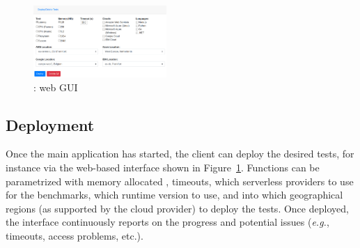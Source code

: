 \begin{figure}[!t]
\begin{center}
\includegraphics[width=0.45\textwidth]{bilder/ui.png}
\caption{\sys: web GUI}
\label{fig:ui}
\end{center}
\end{figure}

\subsection{Deployment}
Once the main application has started, the client can deploy the desired tests, for instance via the web-based interface shown in Figure~\ref{fig:ui}.
Functions can be parametrized with memory allocated , timeouts, which serverless providers to use for the benchmarks, which runtime version to use, and into which geographical regions (as supported by the cloud provider) to deploy the tests. 
Once deployed, the interface continuously reports on the progress and potential issues (\emph{e.g.}, timeouts, access problems, etc.). 
